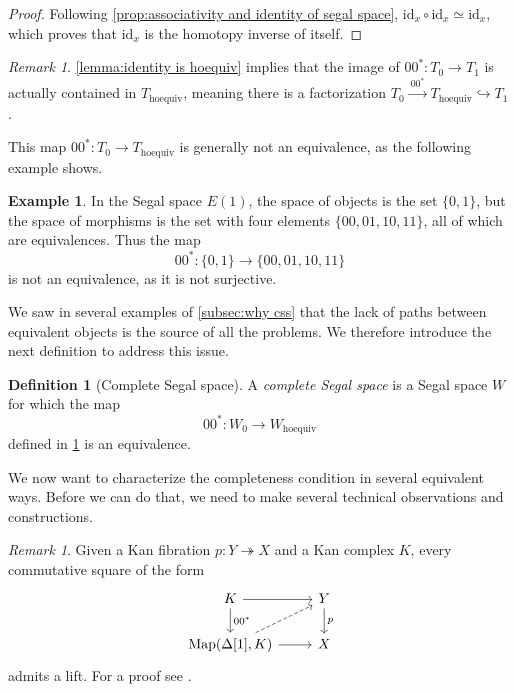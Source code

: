 \documentclass[11pt, a4paper]{amsart}
\newcommand{\Map}{\mathrm{Map}}
\newcommand{\id}{\mathrm{id}}
\newcommand{\hoequiv}{\mathrm{hoequiv}}
\theoremstyle{definition}
\newtheorem{definition}[equation]{Definition}
\newtheorem{example}[equation]{Example}
\theoremstyle{remark}
\newtheorem{remark}[equation]{Remark}
\numberwithin{equation}{section}
\begin{document}
\begin{proof}
 Following \cref{prop:associativity and identity of segal space}, $\id_x \circ \id_x \simeq \id_x$, which proves that $\id_x$ is the homotopy inverse of itself.
\end{proof}

\begin{remark} \label{rem:identity is hoequiv}
  \cref{lemma:identity is hoequiv} implies that the image of $00^*\colon T_0 \to T_1$ is actually contained in $T_{\hoequiv}$, meaning there is a factorization $T_0 \xrightarrow{ \ 00^* \ } T_{\hoequiv} \hookrightarrow T_1$. 
\end{remark}

This map $00^*\colon T_0 \to T_{\hoequiv}$ is generally not an equivalence, as the following example shows.
  
\begin{example} \label{ex:eone not complete}
  In the Segal space $E(1)$, the space of objects is the set $\{ 0,1 \}$, but the space of morphisms is the set with four elements $\{ 00, 01, 10, 11 \}$, all of which are equivalences. Thus the map 
  \[00^*\colon \{0,1\} \to \{00, 01, 10, 11\} \]
  is not an equivalence, as it is not surjective.
\end{example}

We saw in several examples of \cref{subsec:why css} that the lack of paths between equivalent objects is the source of all the problems. We therefore introduce the next definition to address this issue.
 
 \begin{definition}[Complete Segal space] \label{def:css}
  A \emph{complete Segal space} is a Segal space $W$ for which the map 
  \[00^*\colon W_0 \to W_{\hoequiv}\] 
  defined in \cref{rem:identity is hoequiv} is an equivalence.
 \end{definition}
 
We now want to characterize the completeness condition in several equivalent ways. Before we can do that, we need to make several technical observations and constructions.

 \begin{remark} \label{rem:lift}
  Given a Kan fibration $p\colon Y \twoheadrightarrow X$ and a Kan complex $K$, every commutative square of the form 
  \[ 
  \begin{tikzcd}
   K \arrow[r] \arrow[d, "00^*"] & Y \arrow[d, "p"] \\
   {\Map(\Delta[1],K)} \arrow[r] \arrow[ur, dashed] & X
   \end{tikzcd}
  \]
  admits a lift. For a proof see \cite[First paragraph of Section I.9, Theorem 11.3]{goerssjardine2009simplicialhomotopytheory}.
 \end{remark}
\end{document}
